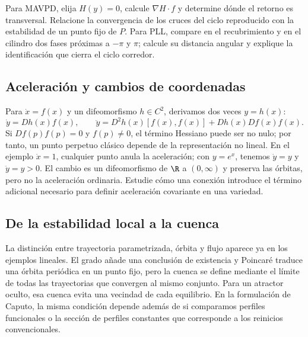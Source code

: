 Para MAVPD, elija \(H(y)=0\), calcule \(\nabla H\cdot f\) y determine
dónde el retorno es transversal. Relacione la convergencia de los cruces
del ciclo reproducido con la estabilidad de un punto fijo de \(P\). Para
PLL, compare en el recubrimiento y en el cilindro dos fases próximas a
\(-\pi\) y \(\pi\); calcule su distancia angular y explique la
identificación que cierra el ciclo corredor.

\subsection{Aceleración y cambios de coordenadas}

Para \(\dot x=f(x)\) y un difeomorfismo \(h\in C^2\), derivamos dos
veces \(y=h(x)\):
\[
 \dot y=Dh(x)f(x),\qquad
 \ddot y=D^2h(x)[f(x),f(x)]+Dh(x)Df(x)f(x).
\]
Si \(Df(p)f(p)=0\) y \(f(p)\ne0\), el término Hessiano puede ser no
nulo; por tanto, un punto perpetuo clásico depende de la representación
no lineal. En el ejemplo \(\dot x=1\), cualquier punto anula la
aceleración; con \(y=e^x\), tenemos \(\dot y=y\) y \(\ddot y=y>0\).
El cambio es un difeomorfismo de \(\R\) a \((0,\infty)\) y preserva
las órbitas, pero no la aceleración ordinaria. Estudie cómo una conexión
introduce el término adicional necesario para definir aceleración covariante
en una variedad.

\subsection{De la estabilidad local a la cuenca}

La distinción entre trayectoria parametrizada, órbita y flujo aparece ya en
los ejemplos lineales. El grado añade una conclusión de existencia y
Poincaré traduce una órbita periódica en un punto fijo, pero la cuenca se
define mediante el límite de todas las trayectorias que convergen al mismo
conjunto. Para un atractor oculto, esa cuenca evita una vecindad de cada
equilibrio. En la formulación de Caputo, la misma condición depende además
de si comparamos perfiles funcionales o la sección de perfiles constantes
que corresponde a los reinicios convencionales.
